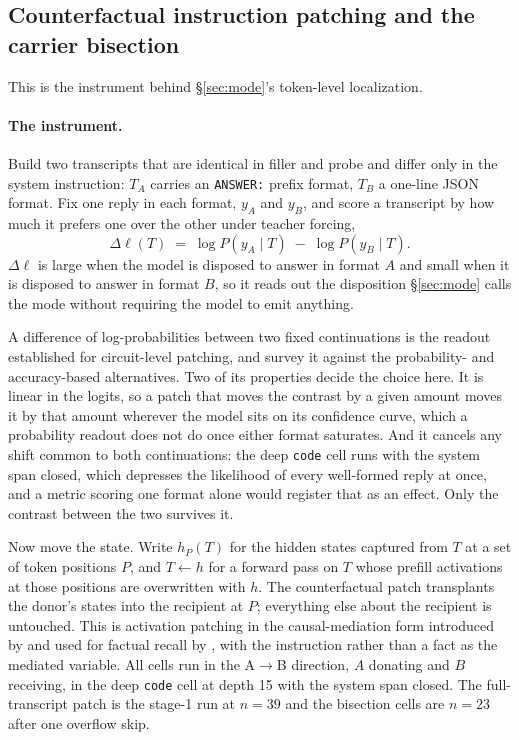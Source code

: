 \documentclass{article}
\begin{document}
\subsection{Counterfactual instruction patching and the carrier bisection}
\label{app:patching}

This is the instrument behind \S\ref{sec:mode}'s token-level localization.

\paragraph{The instrument.}
Build two transcripts that are identical in filler and probe and differ only in the system
instruction: $T_A$ carries an \texttt{ANSWER:} prefix format, $T_B$ a one-line JSON format.
Fix one reply in each format, $y_A$ and $y_B$, and score a transcript by how much it prefers
one over the other under teacher forcing,
\[
  \Delta\ell(T) \;=\; \log P(y_A \mid T) \;-\; \log P(y_B \mid T).
\]
$\Delta\ell$ is large when the model is disposed to answer in format $A$ and small when it is
disposed to answer in format $B$, so it reads out the disposition \S\ref{sec:mode} calls the
mode without requiring the model to emit anything.

A difference of log-probabilities between two fixed continuations is the readout
\citet{wang2023ioi} established for circuit-level patching, and \citet{zhang2024patching}
survey it against the probability- and accuracy-based alternatives. Two of its properties
decide the choice here. It is linear in the logits, so a patch that moves the contrast by a
given amount moves it by that amount wherever the model sits on its confidence curve, which a
probability readout does not do once either format saturates. And it cancels any shift common
to both continuations: the deep \texttt{code} cell runs with the system span closed, which
depresses the likelihood of every well-formed reply at once, and a metric scoring one format
alone would register that as an effect. Only the contrast between the two survives it.

Now move the state. Write $h_P(T)$ for the hidden states captured from $T$ at a set of token
positions $P$, and $T \leftarrow h$ for a forward pass on $T$ whose prefill activations at
those positions are overwritten with $h$. The counterfactual patch transplants the donor's
states into the recipient at $P$; everything else about the recipient is untouched. This is
activation patching in the causal-mediation form introduced by \citet{vig2020mediation} and
used for factual recall by \citet{meng2022rome}, with the instruction rather than a fact as
the mediated variable. All cells
run in the A$\to$B direction, $A$ donating and $B$ receiving, in the deep \texttt{code} cell
at depth 15 with the system span closed. The full-transcript patch is the stage-1 run at
$n{=}39$ and the bisection cells are $n{=}23$ after one overflow skip.
\end{document}
